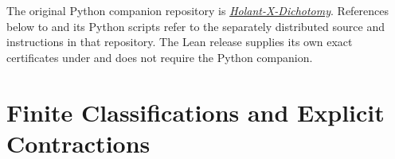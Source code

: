 \documentclass[11pt,letterpaper,onecolumn]{article}
\theoremstyle{plain}
\theoremstyle{definition}
\theoremstyle{remark}
\newcommand{\GitHubIcon}{\mbox{\faGithub}\nobreakspace}}{\newcommand{\GitHubIcon}{}}
\begin{document}
The original Python companion repository is
\href{https://github.com/liuchliuch/Holant-X-Dichotomy}%
{\textcolor{repositorylink}{\GitHubIcon\textit{Holant-X-Dichotomy}}}.
References below to  and its Python scripts refer to
the separately distributed source and instructions in that repository.
The Lean release supplies its own exact certificates under
 and does not require the Python companion.

\clearpage
\appendix
\renewcommand{\thesection}{F.\Alph{section}}
\renewcommand{\theHsection}{fullappendix.\Alph{section}}
\section{Finite Classifications and Explicit Contractions}
\label{sec:exact-finite-certificates}
\end{document}
